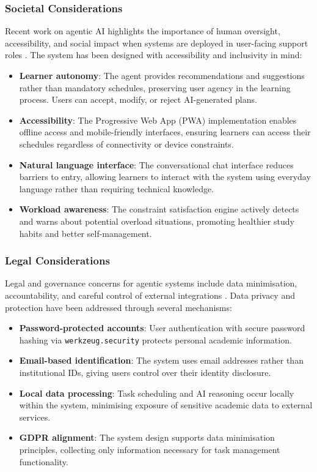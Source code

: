 \documentclass[12pt]{article}
\begin{document}
\subsubsection{Societal Considerations}
Recent work on agentic AI highlights the importance of human oversight, accessibility, and social impact when systems are deployed in user-facing support roles \parencite{hughes2025ai}.
The system has been designed with accessibility and inclusivity in mind:
\begin{itemize}
    \item \textbf{Learner autonomy}: The agent provides recommendations and suggestions rather than mandatory schedules, preserving user agency in the learning process. Users can accept, modify, or reject AI-generated plans.
    \item \textbf{Accessibility}: The Progressive Web App (PWA) implementation enables offline access and mobile-friendly interfaces, ensuring learners can access their schedules regardless of connectivity or device constraints.
    \item \textbf{Natural language interface}: The conversational chat interface reduces barriers to entry, allowing learners to interact with the system using everyday language rather than requiring technical knowledge.
    \item \textbf{Workload awareness}: The constraint satisfaction engine actively detects and warns about potential overload situations, promoting healthier study habits and better self-management.
\end{itemize}

\subsubsection{Legal Considerations}
Legal and governance concerns for agentic systems include data minimisation, accountability, and careful control of external integrations \parencite{shavit2023practices}.
Data privacy and protection have been addressed through several mechanisms:
\begin{itemize}
    \item \textbf{Password-protected accounts}: User authentication with secure password hashing via \texttt{werkzeug.security} protects personal academic information.
    \item \textbf{Email-based identification}: The system uses email addresses rather than institutional IDs, giving users control over their identity disclosure.
    \item \textbf{Local data processing}: Task scheduling and AI reasoning occur locally within the system, minimising exposure of sensitive academic data to external services.
    \item \textbf{GDPR alignment}: The system design supports data minimisation principles, collecting only information necessary for task management functionality.
\end{itemize}
\end{document}
